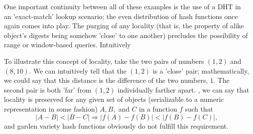 \documentclass[12pt]{article}
\begin{document}
\par One important continuity between all of these examples is the use of a DHT in an 'exact-match' lookup scenario; the even distribution of hash functions once again comes into play. The purging of any locality (that is, the property of alike object's digests being somehow 'close' to one another) precludes the possibility of range or window-based queries. Intuitively

\par To illustrate this concept of locality, take the two pairs of numbers $(1,2)$ and $(8,10)$. We can intuitively tell that the $(1,2)$ is a 'close' pair; mathematically, we could say that this distance is the difference of the two numbers, $1$. The second pair is both 'far' from $(1,2)$ individually farther apart. , we can say that locality is preserved for any given set of objects (serializable to a numeric representation in some fashion) $A,B,$ and $C$ in a function $f$ such that
\begin{equation}
|A-B| < |B-C| \Rightarrow |f(A)-f(B)| < |f(B) - f(C)|,
\end{equation}
and garden variety hash functions obviously do not fulfill this requirement.

\printbibliography
\end{document}
